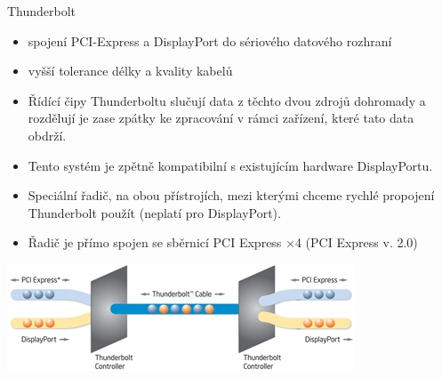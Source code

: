 \documentclass[aspectratio=43]{beamer}
\begin{document}
\begin{frame}{Thunderbolt}
	\begin{itemize}
		\item spojení PCI-Express a DisplayPort do sériového datového rozhraní
		\item vyšší tolerance délky a kvality kabelů
		\item Řídící čipy Thunderboltu slučují data z těchto dvou zdrojů dohromady a rozdělují je zase zpátky ke zpracování v rámci zařízení, které tato data obdrží.
		\item Tento systém je zpětně kompatibilní s existujícím hardware DisplayPortu.
		\item Speciální řadič, na obou přístrojích, mezi kterými chceme rychlé propojení Thunderbolt použít (neplatí pro DisplayPort).
		\item Řadič je přímo spojen se sběrnicí PCI Express ×4 (PCI Express v. 2.0)
	\end{itemize}
	
	\begin{center}
		\includegraphics[width=0.6\linewidth]{extrahovane_obrazky/img_4_page2_0.jpeg}
	\end{center}
	
\end{frame}
\end{document}

